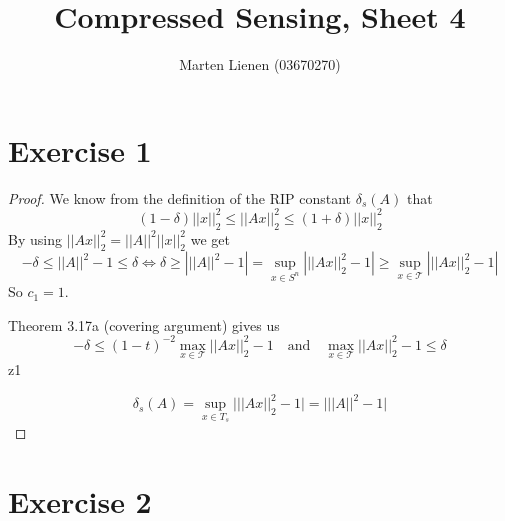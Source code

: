 \documentclass[10pt,a4paper]{article}
\title{Compressed Sensing, Sheet 4}
\author{Marten Lienen (03670270)}
\begin{document}
\maketitle

\section*{Exercise 1}

\begin{proof}
  We know from the definition of the RIP constant $\delta_{s}(A)$ that
  \begin{equation*}
    (1 - \delta)||x||_{2}^{2} \le ||Ax||_{2}^{2} \le (1 + \delta)||x||_{2}^{2}
  \end{equation*}
  By using $||Ax||_{2}^{2} = ||A||^{2}||x||_{2}^{2}$ we get
  \begin{equation*}
    -\delta \le ||A||^{2} - 1 \le \delta \Leftrightarrow \delta \ge \left| ||A||^{2} - 1 \right| = \sup_{x \in S^{n}} \left| ||Ax||_{2}^{2} - 1 \right| \ge \sup_{x \in \mathcal{T}} \left| ||Ax||_{2}^{2} - 1 \right|
  \end{equation*}
  So $c_{1} = 1$.

  Theorem 3.17a (covering argument) gives us
  \begin{equation*}
    -\delta \le (1 - t)^{-2} \max_{x \in \mathcal{T}} ||Ax||_{2}^{2} - 1 \quad \text{and} \quad \max_{x \in \mathcal{T}} ||Ax||_{2}^{2} - 1 \le \delta
  \end{equation*}z1

  \begin{equation*}
    \delta_{s}(A) = \sup_{x \in T_{s}} \big| ||Ax||_{2}^{2} - 1 \big| = \big| ||A||^{2} - 1 \big|
  \end{equation*}
\end{proof}

\section*{Exercise 2}
\end{document}
